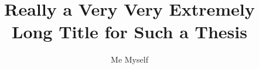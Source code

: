 \documentclass[english,diss]{LEAthesis}
\title{Really a Very Very Extremely Long Title for Such a Thesis}
\author{Me Myself}
\begin{document}
\maketitle              

\frontmatter
    \makedeclaration
    
    \tableofcontents
    
\mainmatter

    
    
    
    
    

\backmatter
    
    
    \lists

    \ifdiss\iffinal\else\fi\fi
\end{document}

